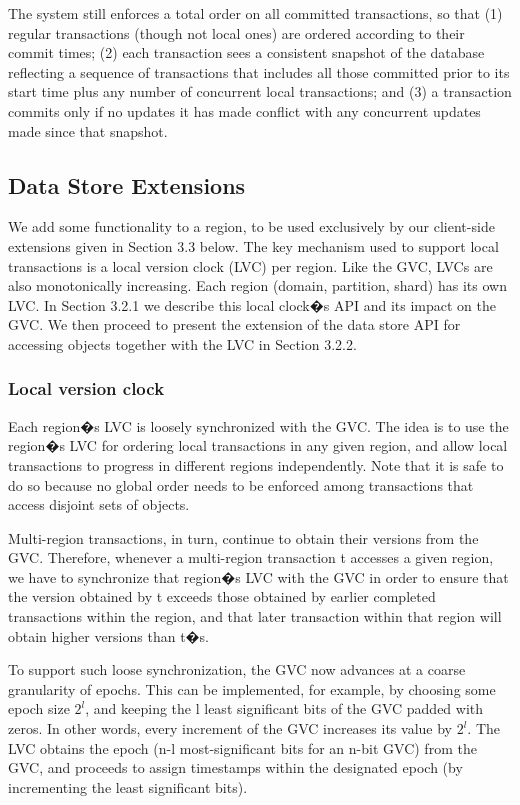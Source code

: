 The system still enforces a total order on all committed transactions, so that
(1) regular transactions (though not local ones) are ordered according to their
commit times; (2) each transaction sees a consistent snapshot of the database
reflecting a sequence of transactions that includes all those committed prior to
its start time plus any number of concurrent local transactions; and (3) a
transaction commits only if no updates it has made conflict with any concurrent
updates made since that snapshot.

\subsection{Data Store Extensions}
We add some functionality to a region, to be used exclusively by our client-side
extensions given in Section 3.3 below. The key mechanism used to support local
transactions is a local version clock (LVC) per region. Like the GVC, LVCs are
also monotonically increasing. Each region (domain, partition, shard) has its
own LVC. In Section 3.2.1 we describe this local clock�s API and its impact on
the GVC. We then proceed to present the extension of the data store API for
accessing objects together with the LVC in Section 3.2.2.

\subsubsection{Local version clock}
Each region�s LVC is loosely synchronized with the GVC. The idea is to use the
region�s LVC for ordering local transactions in any given region, and allow
local transactions to progress in different regions independently. Note that it
is safe to do so because no global order needs to be enforced among transactions
that access disjoint sets of objects.

Multi-region transactions, in turn, continue to obtain their versions from the
GVC. Therefore, whenever a multi-region transaction t accesses a given region,
we have to synchronize that region�s LVC with the GVC in order to ensure that
the version obtained by t exceeds those obtained by earlier completed
transactions within the region, and that later transaction within that region
will obtain higher versions than t�s.

To support such loose synchronization, the GVC now advances at a coarse
granularity of epochs. This can be implemented, for example, by choosing some
epoch size $2^l$, and keeping the l least significant bits of the GVC padded
with zeros. In other words, every increment of the GVC increases its value by
$2^l$.
The LVC obtains the epoch (n-l most-significant bits for an n-bit GVC) from the
GVC, and proceeds to assign timestamps within the designated epoch (by
incrementing the least significant bits).

